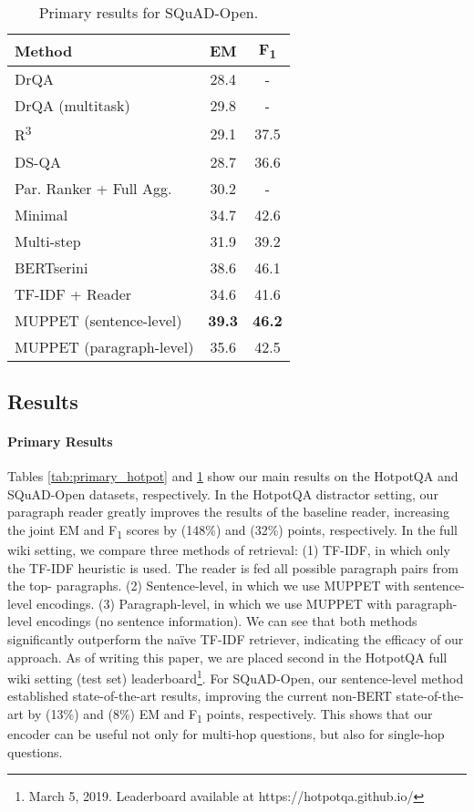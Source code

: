 \documentclass[11pt,a4paper,dvipsnames]{article}
\newcommand\fone{F\textsubscript{1} }
\begin{document}
\begin{table}[h]
    \small
    \centering
    \begin{tabular}{lcc}
        \toprule
        Method & EM & \fone \\
        \midrule
        DrQA \citep{ChenFWB17drqa} & 28.4 & - \\
        DrQA \citep{ChenFWB17drqa} (multitask) & 29.8 & - \\
        R\textsuperscript{3} \citep{WangYGWKZCTZJ18r3} & 29.1 & 37.5 \\
        DS-QA \citep{SunLLJ18denoise} & 28.7 & 36.6 \\
        Par. Ranker + Full Agg. \citep{LeeYKKK18answerrecall} & 30.2 & - \\
        Minimal \citep{SocherZXM18minimal} & 34.7 & 42.6 \\
        Multi-step \citep{das2018multistep} & 31.9 & 39.2 \\
        BERTserini
        \citep{yang2019bert_serini} & 38.6 & 46.1 \\
        \cmidrule{1-3}
        TF-IDF + Reader & 34.6 & 41.6  \\
        MUPPET (sentence-level) & \textbf{39.3} & \textbf{46.2} \\
        MUPPET (paragraph-level) & 35.6 & 42.5 \\
        \bottomrule
    \end{tabular}
    \caption{Primary results for SQuAD-Open. } 
    \label{tab:primary_squad}
\end{table}

\subsection{Results}
\paragraph{Primary Results}
Tables \ref{tab:primary_hotpot} and \ref{tab:primary_squad} show our main results on the HotpotQA and SQuAD-Open datasets, respectively. In the HotpotQA distractor setting, our paragraph reader greatly improves the results of the baseline reader, increasing the joint EM and \fone scores by  (148\%) and  (32\%) points, respectively. 
In the full wiki setting, we compare three methods of retrieval: (1) TF-IDF, in which only the TF-IDF heuristic is used. The reader is fed all possible paragraph pairs from the top- paragraphs. (2) Sentence-level, in which we use MUPPET with sentence-level encodings. (3) Paragraph-level, in which we use MUPPET with paragraph-level encodings (no sentence information).
We can see that both methods significantly outperform the na\"ive TF-IDF retriever, indicating the efficacy of our approach. As of writing this paper, we are placed second in the HotpotQA full wiki setting (test set) leaderboard\footnote{March 5, 2019. Leaderboard available at https://hotpotqa.github.io/}. For SQuAD-Open, our sentence-level method established state-of-the-art results, improving the current non-BERT \citep{bert} state-of-the-art by  (13\%) and  (8\%) EM and \fone points, respectively. This shows that our encoder can be useful not only for multi-hop questions, but also for single-hop questions.
\end{document}
